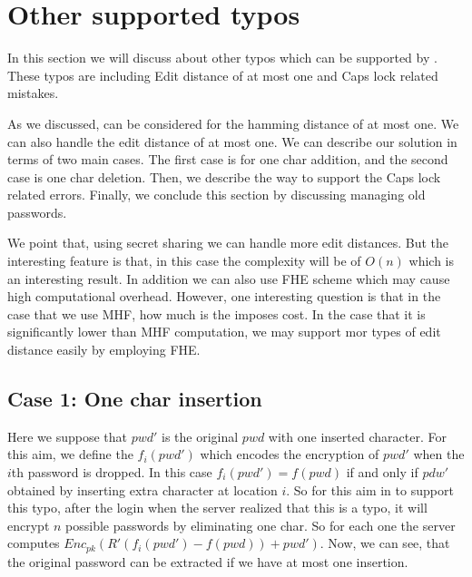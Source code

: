 %
%
%
%
%

\section{Other supported typos}
In this section we will discuss about other typos which can be supported by . These typos are including Edit distance of at most one and  Caps lock related mistakes. 

  
As we discussed,  can be considered for the hamming distance of at most one. We can also handle the edit distance of at most one. We can describe our solution in terms of two main cases. The first case is for one char addition, and the second case is one char deletion. Then, we describe the way to support the Caps lock related errors. Finally, we conclude this section by discussing managing old passwords. 


We point that, using secret sharing we can handle more edit distances. But the interesting feature is that, in this case the complexity will be of $ O(n) $ which is an interesting result. In addition we can also use FHE scheme which may cause high computational overhead. However, one interesting question is that in the case that we use MHF, how much is the imposes cost. In the case that it is significantly lower than MHF computation, we may support mor types of edit distance easily by employing FHE. 


\subsection{Case 1: One char insertion}
Here we suppose that $ pwd' $ is the original $ pwd  $ with one inserted character. For this aim, we define the $ f_i(pwd') $ which encodes the encryption of $ pwd' $ when the $ i $th password is dropped. In this case $ f_i(pwd') = f(pwd) $ if and only if $ pdw' $ obtained by inserting extra character at location $ i $. So for this aim in to support this typo, after the login when the server realized that this is a typo, it will encrypt $ n $ possible passwords by eliminating one char. So for each one the server computes $ Enc_{pk}(R'(f_i(pwd') - f(pwd)) + pwd') $. Now, we can see, that the original password can be extracted if we have at most one insertion. 

